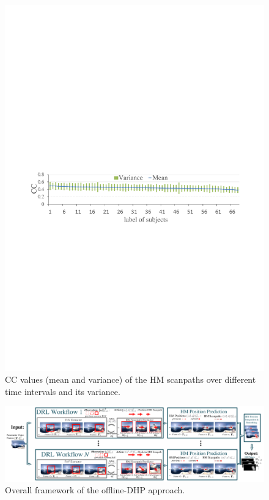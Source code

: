 \documentclass[10pt,journal,compsoc]{IEEEtran}
\begin{document}
\begin{figure}
	\begin{center}
     \vspace{-1em}
		\centerline{\includegraphics[width=.95\columnwidth]{figures/database/consi_on_time}}%
        \vspace{-1em}
		\caption{\footnotesize{CC values (mean and variance) of the HM scanpaths over different time intervals and its variance. }}
		\label{consi_on_time}
	\end{center}
\vspace{-2.5em}
\end{figure}

\begin{figure}
	\begin{center}
        \vspace{-1em}
		\centerline{\includegraphics[width=2.0\columnwidth]{figures/dhp_approach/main_framework}}%
        \vspace{-1em}
		\caption{\footnotesize{Overall framework of the offline-DHP approach.}}
		\label{main-framework}
	\end{center}
\vspace{-1em}
\end{figure}
\end{document}
